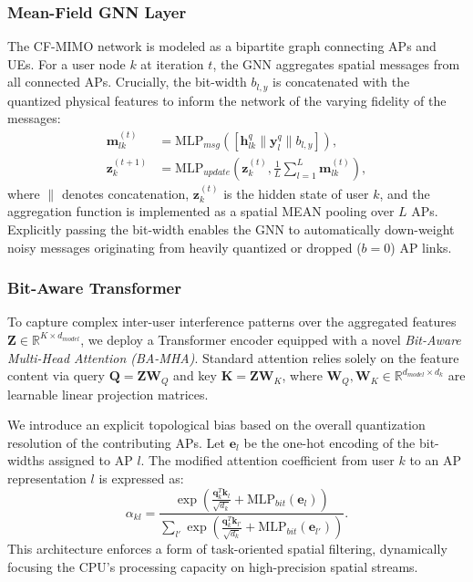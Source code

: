 \subsubsection{Mean-Field GNN Layer}
The CF-MIMO network is modeled as a bipartite graph connecting APs and UEs. For a user node $k$ at iteration $t$, the GNN aggregates spatial messages from all connected APs. Crucially, the bit-width $b_{l,y}$ is concatenated with the quantized physical features to inform the network of the varying fidelity of the messages:
\begin{align}
    \mathbf{m}_{lk}^{(t)} &= \text{MLP}_{msg}\left( \left[ \mathbf{h}_{lk}^q \parallel \mathbf{y}_l^q \parallel b_{l,y} \right] \right), \\
    \mathbf{z}_{k}^{(t+1)} &= \text{MLP}_{update}\left( \mathbf{z}_k^{(t)}, \frac{1}{L} \sum_{l=1}^L \mathbf{m}_{lk}^{(t)} \right),
\end{align}
where $\parallel$ denotes concatenation, $\mathbf{z}_k^{(t)}$ is the hidden state of user $k$, and the aggregation function is implemented as a spatial MEAN pooling over $L$ APs. Explicitly passing the bit-width enables the GNN to automatically down-weight noisy messages originating from heavily quantized or dropped ($b=0$) AP links.

\subsubsection{Bit-Aware Transformer}
To capture complex inter-user interference patterns over the aggregated features $\mathbf{Z} \in \mathbb{R}^{K \times d_{model}}$, we deploy a Transformer encoder equipped with a novel \textit{Bit-Aware Multi-Head Attention (BA-MHA)}. Standard attention relies solely on the feature content via query $\mathbf{Q} = \mathbf{Z}\mathbf{W}_Q$ and key $\mathbf{K} = \mathbf{Z}\mathbf{W}_K$, where $\mathbf{W}_Q, \mathbf{W}_K \in \mathbb{R}^{d_{model} \times d_k}$ are learnable linear projection matrices.

We introduce an explicit topological bias based on the overall quantization resolution of the contributing APs. Let $\mathbf{e}_{l}$ be the one-hot encoding of the bit-widths assigned to AP $l$. The modified attention coefficient from user $k$ to an AP representation $l$ is expressed as:
\begin{equation}
    \alpha_{kl} = \frac{\exp\left( \frac{\mathbf{q}_k^T \mathbf{k}_l}{\sqrt{d_k}} + \text{MLP}_{bit}(\mathbf{e}_l) \right)}{\sum_{l'} \exp\left( \frac{\mathbf{q}_k^T \mathbf{k}_{l'}}{\sqrt{d_k}} + \text{MLP}_{bit}(\mathbf{e}_{l'}) \right)}.
\end{equation}
This architecture enforces a form of task-oriented spatial filtering, dynamically focusing the CPU's processing capacity on high-precision spatial streams.

